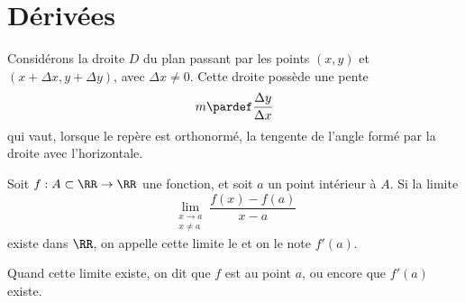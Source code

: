 \section{Dérivées}
\begin{frame}
  \begin{rappel}
    Considérons la droite $D$ du plan passant par les points $(x,y)$ et $(x+\Delta x,y+\Delta y)$, avec \(\Delta x \neq 0\). Cette droite possède une pente
    \begin{equation*}
      m \pardef \frac{\Delta y}{\Delta x}
    \end{equation*}
    qui vaut, lorsque le repère est orthonormé, la tengente de l'angle formé par la droite avec l'horizontale.
  \end{rappel}\pause
  \begin{definition}
    Soit $f : A \subset \RR \to \RR$ une fonction, et soit $a$ un point intérieur à $A$. Si la limite
    \begin{equation*}
      \lim_{\substack{x \to a\\ x \neq a}} \frac{f(x)-f(a)}{x-a}
    \end{equation*}
    existe dans \(\RR\), on appelle cette limite le  et on le note $f'(a)$.
  \end{definition}\pause

  Quand cette limite existe, on dit que $f$ est  au point $a$, ou encore que $f'(a)$ existe.
\end{frame}
\begin{frame}
  
\end{frame}

